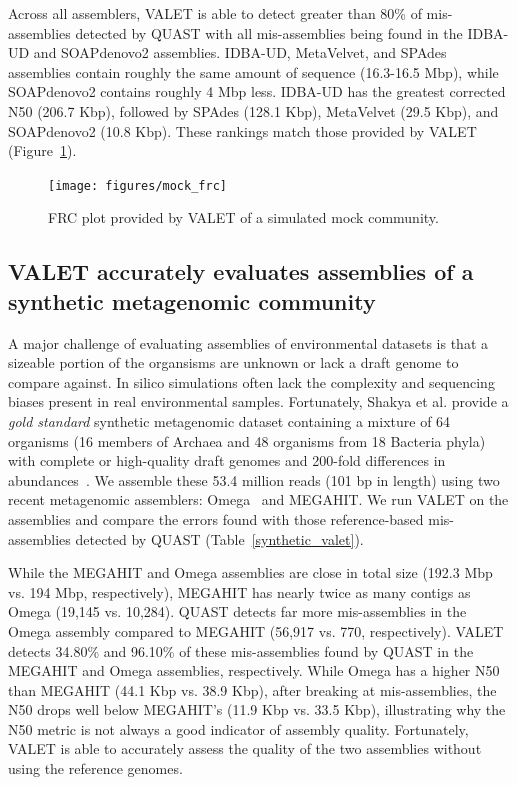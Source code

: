 \documentclass[12pt,\mydriver]{thesis}
\begin{document}
Across all assemblers, VALET is able to detect greater than 80\% of mis-assemblies detected by QUAST with all mis-assemblies being found in the IDBA-UD and SOAPdenovo2 assemblies.
IDBA-UD, MetaVelvet, and SPAdes assemblies contain roughly the same amount of sequence (16.3-16.5 Mbp), while SOAPdenovo2 contains roughly 4 Mbp less.
IDBA-UD has the greatest corrected N50 (206.7 Kbp), followed by SPAdes (128.1 Kbp), MetaVelvet (29.5 Kbp), and SOAPdenovo2 (10.8 Kbp).
These rankings match those provided by VALET (Figure~\ref{fig:mock_frc}).



\begin{figure}[tb!]
\begin{center}
\texttt{[image: figures/mock\_frc]}
\end{center}
\renewcommand{\baselinestretch}{1}
\small\normalsize
\begin{quote}
\caption[RC plot of a simulated mock community]{FRC plot provided by VALET of a simulated mock community.}
\label{fig:mock_frc}
\end{quote}
\end{figure}
\renewcommand{\baselinestretch}{2}
\small\normalsize


\subsection{VALET accurately evaluates assemblies of a synthetic metagenomic community}

A major challenge of evaluating assemblies of environmental datasets is that a sizeable portion of the organsisms are unknown or lack a draft genome to compare against.
In silico simulations often lack the complexity and sequencing biases present in real environmental samples.
Fortunately, Shakya et al. provide a \emph{gold standard} synthetic metagenomic dataset containing a mixture of 64 organisms (16 members of Archaea and 48 organisms from 18 Bacteria phyla) with complete or high-quality draft genomes and 200-fold differences in abundances~\cite{shakya2013comparative}.
We assemble these 53.4 million reads (101 bp in length) using two recent metagenomic assemblers: Omega~\cite{haider2014omega} and MEGAHIT\cite{li2015megahit}.
We run VALET on the assemblies and compare the errors found with those reference-based mis-assemblies detected by QUAST (Table~\ref{synthetic_valet}).


While the MEGAHIT and Omega assemblies are close in total size (192.3 Mbp vs. 194 Mbp, respectively), MEGAHIT has nearly twice as many contigs as Omega (19,145 vs. 10,284).
QUAST detects far more mis-assemblies in the Omega assembly compared to MEGAHIT (56,917 vs. 770, respectively).
VALET detects 34.80\% and 96.10\% of these mis-assemblies found by QUAST in the MEGAHIT and Omega assemblies, respectively.
While Omega has a higher N50 than MEGAHIT (44.1 Kbp vs. 38.9 Kbp), after breaking at mis-assemblies, the N50 drops well below MEGAHIT's (11.9 Kbp vs. 33.5 Kbp), illustrating why the N50 metric is not always a good indicator of assembly quality.
Fortunately, VALET is able to accurately assess the quality of the two assemblies without using the reference genomes.
\end{document}
